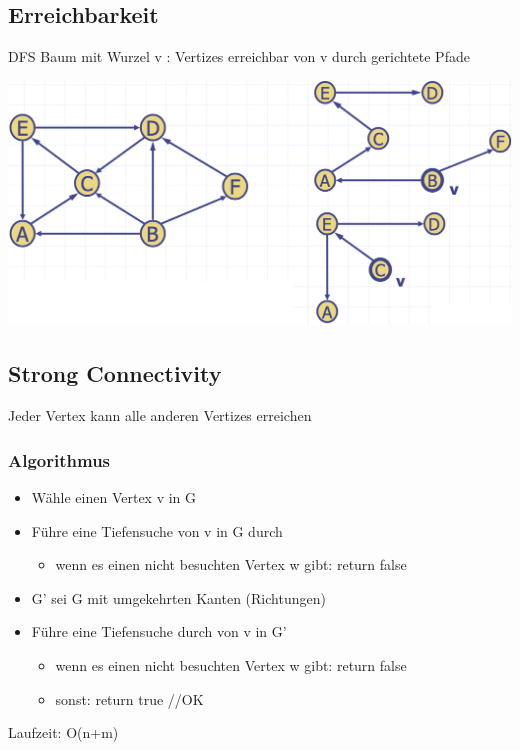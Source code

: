 \subsection{Erreichbarkeit}
DFS Baum mit Wurzel v : Vertizes erreichbar von v durch gerichtete Pfade
\vspace{-8pt}
\begin{center}
    \includegraphics[scale=.22]{graphic/14 Digraphs/Erreichbarkeit.png}
\end{center}
\vspace{-8pt}

\subsection{Strong Connectivity}
Jeder Vertex kann alle anderen Vertizes erreichen
\subsubsection{Algorithmus}
\begin{itemize}
    \item Wähle einen Vertex v in G
    \item Führe eine Tiefensuche von v in G durch
    \begin{itemize}
        \item wenn es einen nicht besuchten Vertex w gibt: return false
    \end{itemize}
    \item G’ sei G mit umgekehrten Kanten (Richtungen)
    \item Führe eine Tiefensuche durch von v in G’
    \begin{itemize}
        \item wenn es einen nicht besuchten Vertex w gibt: return false
        \item sonst: return true //OK
    \end{itemize}
\end{itemize}
Laufzeit: O(n+m)

